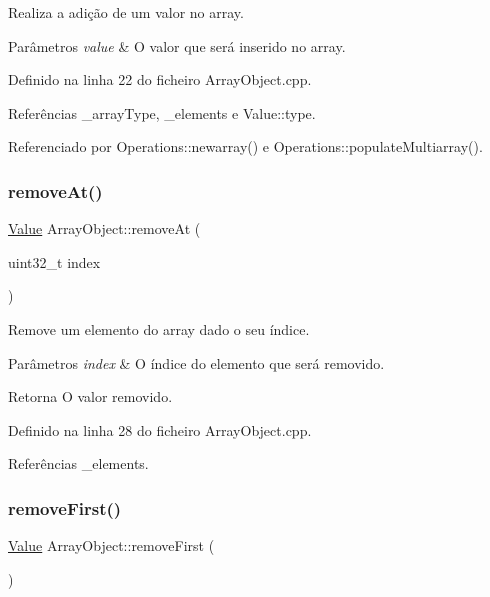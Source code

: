 Realiza a adição de um valor no array. 


\begin{DoxyParams}{Parâmetros}
{\em value} & O valor que será inserido no array. \\
\hline
\end{DoxyParams}


Definido na linha 22 do ficheiro Array\+Object.\+cpp.



Referências \+\_\+array\+Type, \+\_\+elements e Value\+::type.



Referenciado por Operations\+::newarray() e Operations\+::populate\+Multiarray().

\mbox{\label{classArrayObject_ab229e48175e46d03c2fab756cce11b5f}} 
\subsubsection{\texorpdfstring{remove\+At()}{removeAt()}}
{\footnotesize\ttfamily \hyperlink{structValue}{Value} Array\+Object\+::remove\+At (\begin{DoxyParamCaption}\item[{uint32\+\_\+t}]{index }\end{DoxyParamCaption})}



Remove um elemento do array dado o seu índice. 


\begin{DoxyParams}{Parâmetros}
{\em index} & O índice do elemento que será removido. \\
\hline
\end{DoxyParams}
\begin{DoxyReturn}{Retorna}
O valor removido. 
\end{DoxyReturn}


Definido na linha 28 do ficheiro Array\+Object.\+cpp.



Referências \+\_\+elements.

\mbox{\label{classArrayObject_aaf722b5670d62f09370aeab36ebe0dfd}} 
\subsubsection{\texorpdfstring{remove\+First()}{removeFirst()}}
{\footnotesize\ttfamily \hyperlink{structValue}{Value} Array\+Object\+::remove\+First (\begin{DoxyParamCaption}{ }\end{DoxyParamCaption})}




